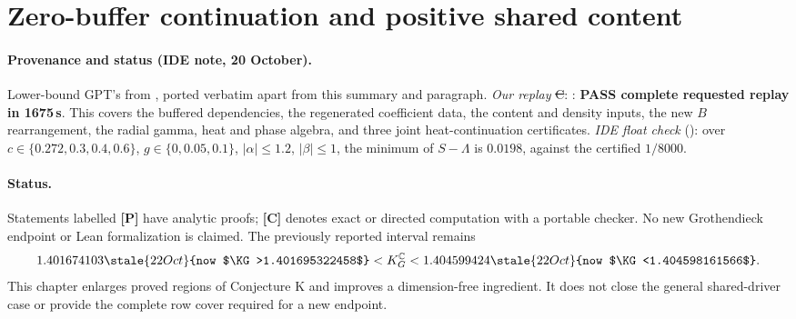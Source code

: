 \section{Zero-buffer continuation and positive shared content}
\label{ch:zero-buffer-bootstrap}

\paragraph{Provenance and status (IDE note, 20 October).} Lower-bound GPT's  from , ported verbatim
apart from this summary and paragraph. \emph{Our replay} \st{C}: : \textbf{PASS complete requested replay in 1675\,s}. This covers the buffered
dependencies, the regenerated coefficient data, the content and density inputs, the new $B$ rearrangement, the radial gamma, heat and phase algebra, and three joint heat-continuation
certificates. \emph{IDE float check} (): over $c\in\{0.272,0.3,0.4,0.6\}$, $g\in\{0,0.05,0.1\}$, $|\alpha|\le1.2$, $|\beta|\le1$, the minimum of
$S-\Lambda$ is $0.0198$, against the certified $1/8000$.


\paragraph{Status.}
Statements labelled \textbf{[P]} have analytic proofs;
\textbf{[C]} denotes exact or directed computation with a portable checker.
No new Grothendieck endpoint or Lean formalization is claimed.
The previously reported interval remains
\[
1.401674103\stale{22 Oct}{now $\KG>1.401695322458$}<K_G^{\mathbb C}<1.404599424\stale{22 Oct}{now $\KG<1.404598161566$}.
\]
This chapter enlarges proved regions of Conjecture K and improves a
dimension-free ingredient.  It does not close the general shared-driver
case or provide the complete row cover required for a new endpoint.

